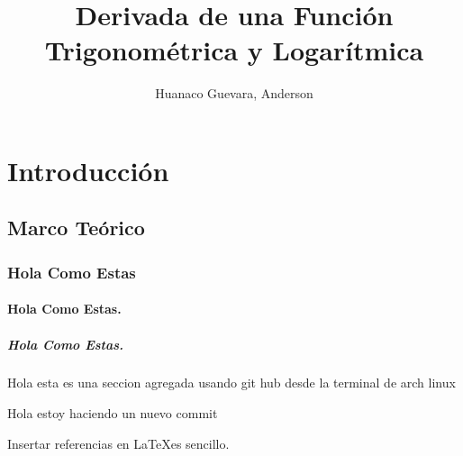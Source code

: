 \documentclass[a4paper, 11pt]{report}
\title{Derivada de una Función Trigonométrica y Logarítmica}
\author{Huanaco Guevara, Anderson}
\begin{document}

\newpage
\tableofcontents
\thispagestyle{empty}
\newpage
\setcounter{page}{1}

\chapter{Introducción}
\lipsum[1-2]

\section{Marco Teórico}

\lipsum[1-2]
\subsection{Hola Como Estas}
\lipsum[1-2]

\subsubsection{Hola Como Estas.}
\lipsum[1-2]

\paragraph{Hola Como Estas.}
\lipsum[1-2]


Hola esta es una seccion agregada usando git hub desde la terminal de arch linux

Hola estoy haciendo un nuevo commit 

Insertar referencias en \LaTeX es sencillo. \cite{castrillon2014mecanica}





\end{document}
